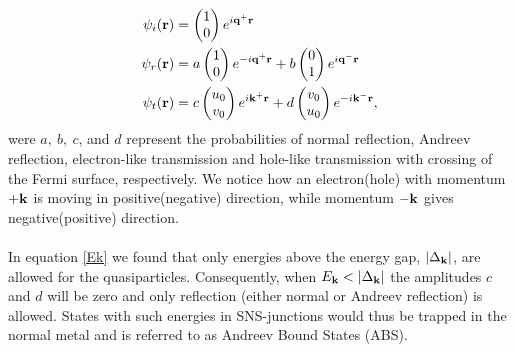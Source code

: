 \begin{equation}
\begin{split}
    \psi_i(\mathbf{r})&=\begin{pmatrix}1 \\ 0\end{pmatrix}e^{i\mathbf{q}^+\mathbf{r}}\\
    \psi_r(\mathbf{r})&=a\begin{pmatrix}1 \\ 0\end{pmatrix}e^{-i\mathbf{q}^+\mathbf{r}}
    + b\begin{pmatrix}0 \\ 1\end{pmatrix}e^{i\mathbf{q}^-\mathbf{r}}\\
    \psi_t(\mathbf{r})&=c\begin{pmatrix}u_0\\v_0\end{pmatrix}e^{i\mathbf{k}^+\mathbf{r}} + d \begin{pmatrix}v_0\\u_0\end{pmatrix}e^{-i\mathbf{k}^-\mathbf{r}},
\end{split}
\end{equation}
were $a, \ b, \ c$, and $d$ represent the probabilities of normal reflection, Andreev reflection, electron-like transmission and hole-like transmission with crossing of the Fermi surface, respectively. We notice how an electron(hole) with momentum $+\mathbf{k}$ is moving in positive(negative) direction, while momentum $-\mathbf{k}$ gives negative(positive) direction.
\\
\\
In equation \eqref{Ek} we found that only energies above the energy gap, $\left|\Delta_{\mathbf{k}}\right|$, are allowed for the quasiparticles. Consequently, when $E_{\mathbf{k}}<\left|\Delta_{\mathbf{k}}\right|$ the amplitudes $c$ and $d$ will be zero and only reflection (either normal or Andreev reflection) is allowed. States with such energies in SNS-junctions would thus be trapped in the normal metal and is referred to as Andreev Bound States (ABS).